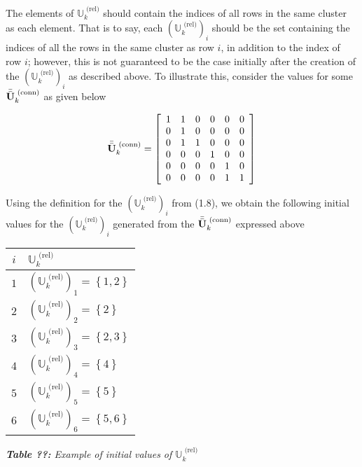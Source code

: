 \documentclass[../../ClusteringConnectionsMAIN.tex]{subfiles}
\begin{document}
\begin{flushleft}
\begin{large}

The elements of $\mathbb{U}_k^\text{ (rel)}$ should contain the indices of all rows in the same cluster as each element.  That is to say, each $\left( \mathbb{U}_k^\text{ (rel)} \right)_i$ should be the set containing the indices of all the rows in the same cluster as row $i$, in addition to the index of row $i$; however, this is not guaranteed to be the case initially after the creation of the $\left( \mathbb{U}_k^\text{ (rel)} \right)_i$ as described above.  To illustrate this, consider the values for some $\bar{\bar{\mathbf{U}}}_k^\text{ (conn)}$ as given below

\begin{align}
\bar{\bar{\mathbf{U}}}_k^\text{ (conn)} = \left[
\begin{array}{c c c c c c}
	1 & 1 & 0 & 0 & 0 & 0 \\
	0 & 1 & 0 & 0 & 0 & 0 \\
	0 & 1 & 1 & 0 & 0 & 0 \\
	0 & 0 & 0 & 1 & 0 & 0 \\
	0 & 0 & 0 & 0 & 1 & 0 \\
	0 & 0 & 0 & 0 & 1 & 1
\end{array} \right]
\end{align}

Using the definition for the $\left( \mathbb{U}_k^\text{ (rel)} \right)_i$ from (1.8), we obtain the following initial values for the $\left( \mathbb{U}_k^\text{ (rel)} \right)_i$ generated from the $\bar{\bar{\mathbf{U}}}_k^\text{ (conn)}$ expressed above

\begin{center}
\begin{tabular}{c | l}
$i$ & $\mathbb{U}_k^\text{ (rel)}$ \\
\hline
$1$ & $\left( \mathbb{U}_k^\text{ (rel)} \right)_1 = \left\{ 1, 2 \right\}$ \\
$2$ & $\left( \mathbb{U}_k^\text{ (rel)} \right)_2 = \left\{ 2 \right\}$ \\
$3$ & $\left( \mathbb{U}_k^\text{ (rel)} \right)_3 = \left\{ 2, 3 \right\}$ \\
$4$ & $\left( \mathbb{U}_k^\text{ (rel)} \right)_4 = \left\{ 4 \right\}$ \\
$5$ & $\left( \mathbb{U}_k^\text{ (rel)} \right)_5 = \left\{ 5 \right\}$ \\
$6$ & $\left( \mathbb{U}_k^\text{ (rel)} \right)_6 = \left\{ 5, 6 \right\}$ 
\end{tabular}
\end{center}
\begin{center}
\emph{\textbf{Table ??:} Example of initial values of $\mathbb{U}_k^\text{ (rel)}$}
\end{center}


\end{large}
\end{flushleft}
\end{document}
